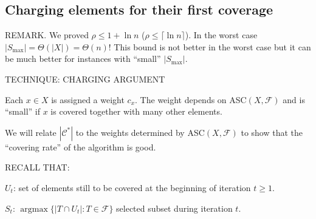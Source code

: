\subsection{Charging elements for their first coverage}
REMARK. We proved $\rho\leq1+\ln n$ ($\rho\leq\lceil\ln n\rceil$). In the worst case $|S_{\max}|=\Theta(|X|)=\Theta(n)$! This bound is not better in the worst case but it can be much better for instances with ``small'' $|S_{\max}|$.

TECHNIQUE: CHARGING ARGUMENT

Each $x\in X$ is assigned a weight $c_x$. The weight depends on ASC$(X,\mathcal F)$ and is ``small'' if $x$ is covered together with many other elements.

We will relate $|\mathcal C^*|$ to the weights determined by ASC$(X,\mathcal F)$ to show that the ``covering rate'' of the algorithm is good.

RECALL THAT:
\begin{notesdefinition}
$U_t$: set of elements still to be covered at the beginning of iteration $t\geq1$.

$S_t$: $\operatorname{argmax}\{|T\cap U_t|:T\in\mathcal F\}$ selected subset during iteration $t$.
\end{notesdefinition}
